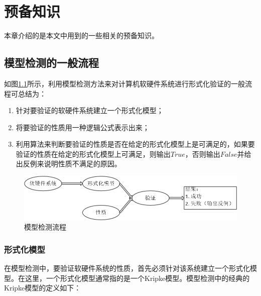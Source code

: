 \chapter{预备知识}\label{chapt:preliminary}
本章介绍的是本文中用到的一些相关的预备知识。
\section{模型检测的一般流程}
如图\ref{modelchecking:overview}所示，利用模型检测方法来对计算机软硬件系统进行形式化验证的一般流程可总结为：
\begin{enumerate}
	\item 针对要验证的软硬件系统建立一个形式化模型；
	\item 将要验证的性质用一种逻辑公式表示出来；
	\item 利用算法来判断要验证的性质是否在给定的形式化模型上是可满足的，如果要验证的性质在给定的形式化模型上可满足，则输出$True$，否则输出$False$并给出反例来说明性质不满足的原因。
\end{enumerate}
\begin{figure}[h!]
	\centering
	\includegraphics[width=12cm]{Img/model_checking_overview.png}
	\caption{模型检测流程}
	\label{modelchecking:overview}
\end{figure}
\subsection{形式化模型}
在模型检测中，要验证软硬件系统的性质，首先必须针对该系统建立一个形式化模型。在这里，一个形式化模型通常指的是一个Kripke模型。模型检测中的经典的Kripke模型的定义如下：


